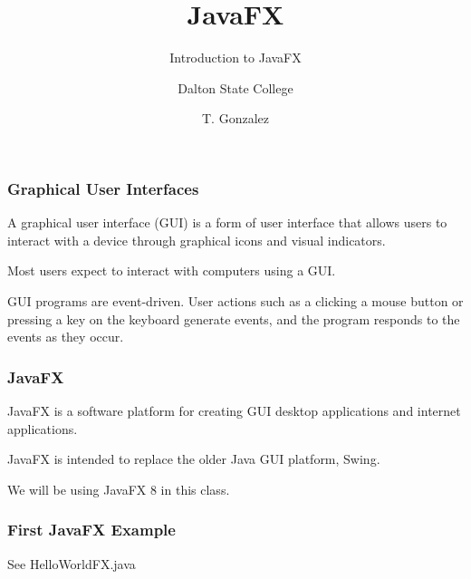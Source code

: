 \documentclass{beamer}
\title[Introduction to JavaFX]{JavaFX}
\subtitle{Introduction to JavaFX} %
\author[]{Dalton State College}
\date[T. Gonzalez]{T. Gonzalez}
\begin{document}
\begin{frame}

	\titlepage
	
\end{frame}

\begin{frame}
    
    \frametitle{Graphical User Interfaces}
    
    A graphical user interface (GUI) is a form of user interface that allows users to interact with a device through graphical icons and visual indicators.
    
    \bigskip
    
    Most users expect to interact with computers using a GUI.
    
    \bigskip
    
    GUI programs are event-driven.  User actions such as a clicking a mouse button or pressing a key on the keyboard generate events, and the program responds to the events as they occur. 
\end{frame}
\begin{frame}[fragile]

	\frametitle{JavaFX}
	
	JavaFX is a software platform for creating GUI desktop applications and internet applications. 

    \bigskip

    JavaFX is intended to replace the older Java GUI platform, Swing.
    
    \bigskip
    
    We will be using JavaFX 8 in this class.  

\end{frame}
	
\begin{frame}[fragile]

	\frametitle{First JavaFX Example}
	
    See HelloWorldFX.java
	
\end{frame}
\end{document}
